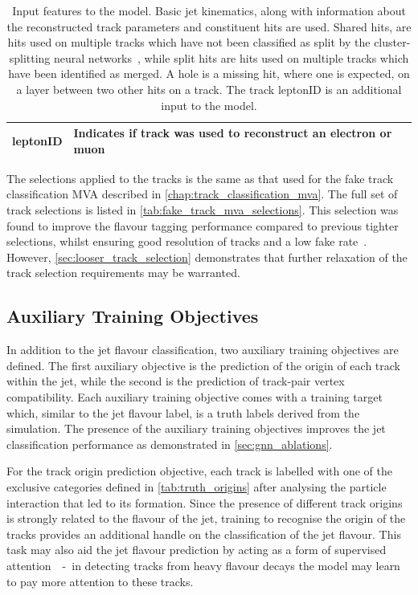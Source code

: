 \begin{table}[!htbp]
\begin{tabular}{ll}
    leptonID   & Indicates if track was used to reconstruct an electron or muon \\
    \hline\bottomrule
  \end{tabular}
  \caption{
    Input features to the \GNN model.
    Basic jet kinematics, along with information about the reconstructed track parameters and constituent hits are used.
    Shared hits, are hits used on multiple tracks which have not been classified as split by the cluster-splitting neural networks~\cite{PERF-2015-08}, while split hits are hits used on multiple tracks which have been identified as merged.
    A hole is a missing hit, where one is expected, on a layer between two other hits on a track.
    The track leptonID is an additional input to the \GNNLep model.
  }
  \label{tab:track_inputs}
\end{table}

The selections applied to the tracks is the same as that used for the fake track classification MVA described in \cref{chap:track_classification_mva}.
The full set of track selections is listed in \cref{tab:fake_track_mva_selections}.
This selection was found to improve the flavour tagging performance compared to previous tighter selections, whilst ensuring good resolution of tracks and a low fake rate~\cite{PERF-2015-08}.
However, \cref{sec:looser_track_selection} demonstrates that further relaxation of the track selection requirements may be warranted. 


\subsection{Auxiliary Training Objectives}\label{sec:aux-train-objectives}

In addition to the jet flavour classification, two auxiliary training objectives are defined.
The first auxiliary objective is the prediction of the origin of each track within the jet, while the second is the prediction of track-pair vertex compatibility. 
Each auxiliary training objective comes with a training target which, similar to the jet flavour label, is a truth labels derived from the simulation.
The presence of the auxiliary training objectives improves the jet classification performance as demonstrated in \cref{sec:gnn_ablations}.

For the track origin prediction objective, each track is labelled with one of the exclusive categories defined in \cref{tab:truth_origins} after analysing the particle interaction that led to its formation. 
Since the presence of different track origins is strongly related to the flavour of the jet, training \GNN to recognise the origin of the tracks provides an additional handle on the classification of the jet flavour.
This task may also aid the jet flavour prediction by acting as a form of supervised attention~\cite{arxiv.2007.08294}~-~in detecting tracks from heavy flavour decays the model may learn to pay more attention to these tracks.

